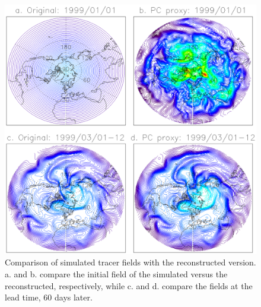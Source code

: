 \begin{figure}
\begin{center}
\includegraphics[width=1\textwidth]{proxyfields.eps}
\caption{Comparison of simulated tracer fields with the reconstructed version.
a. and b. compare the initial field of the simulated versus the reconstructed,
respectively, while c. and d. compare the fields at the lead time,
60 days later.}
\label{proxyfields}
\end{center}
\end{figure}

